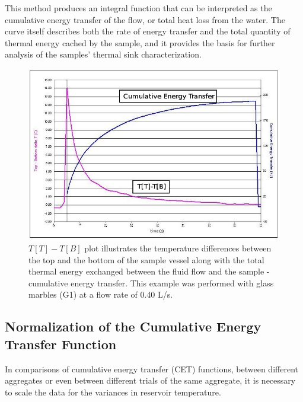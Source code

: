 This method produces an integral function that can be interpreted as the cumulative energy transfer of the flow, or total heat loss from the water. The curve itself describes both the rate of energy transfer and the total quantity of thermal energy cached by the sample, and it provides the basis for further analysis of the samples' thermal sink characterization.

\begin{landscape}
\begin{figure}
\begin{center}
\includegraphics[scale=.65]{tempDiff.JPG}
\caption[Temperature Difference and CET Plot]{$T[T]-T[B]$ plot illustrates the temperature differences between the top and the bottom of the sample vessel along with the total thermal energy exchanged between the fluid flow and the sample - cumulative energy transfer. This example was performed with glass marbles (G1) at a flow rate of 0.40 L/s.\label{tempDiff}}
\end{center}
\end{figure}
\end{landscape}

\subsection{Normalization of the Cumulative Energy Transfer Function}
In comparisons of cumulative energy transfer (CET) functions, between different aggregates or even between different trials of the same aggregate, it is necessary to scale the data for the variances in reservoir temperature. 

